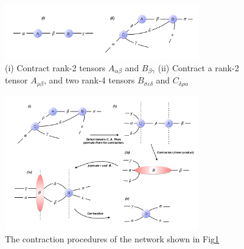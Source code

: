 \begin{figure}[H]
	\centering
	\includegraphics[width=0.75\textwidth]{figures/fig222.png}
	\caption[The examples of tensor diagrams.]{(i) Contract rank-2 tensors $A_{\alpha \beta}$ and $B_{\beta \gamma} $ (ii) Contract a rank-2 tensor $A_{\rho \beta}$, and two rank-4 tensors $B_{\sigma \varepsilon \delta}$ and $C_{\delta \rho \alpha}$}
	\label{fig222}
\end{figure}

\begin{figure}[ht]
	\centering
	\includegraphics[width=0.75\textwidth]{figures/fig223.png}
	\caption[The contraction procedures of the network shown in Fig\ref{fig222}(ii)]{ The contraction procedures of the network shown in Fig\ref{fig222}}
	\label{fig223}
\end{figure}

